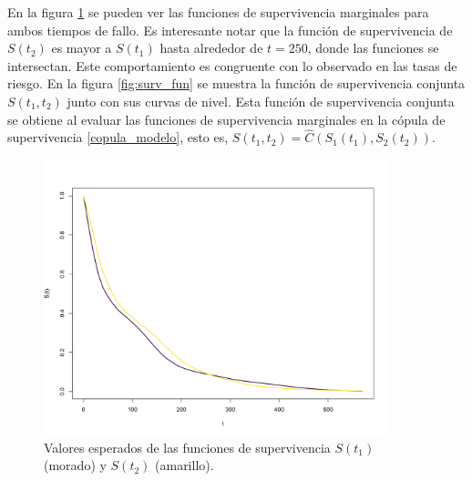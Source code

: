 \documentclass[11pt,a4paper]{article}
\begin{document}
\newpage

En la figura \ref{fig:surv_fun_marginal} se pueden ver las funciones de supervivencia marginales para ambos tiempos de fallo. Es interesante notar que la función de supervivencia de $S(t_2)$ es mayor a $S(t_1)$ hasta alrededor de $t=250$, donde las funciones se intersectan. Este comportamiento es congruente con lo observado en las tasas de riesgo. En la figura \ref{fig:surv_fun} se muestra la función de supervivencia conjunta $S(t_1, t_2)$ junto con sus curvas de nivel. Esta función de supervivencia conjunta se obtiene al evaluar las funciones de supervivencia marginales en la cópula de supervivencia \eqref{copula_modelo}, esto es, $S(t_1, t_2) = \widehat{C}(S_1(t_1), S_2(t_2))$.

\begin{figure}[!htb]
\centering\includegraphics[width=10cm]{surv_fun_marginal.png}
\caption{Valores esperados de las funciones de supervivencia $S(t_1)$ (morado) y $S(t_2)$ (amarillo).}
\label{fig:surv_fun_marginal}
\end{figure}
\end{document}
